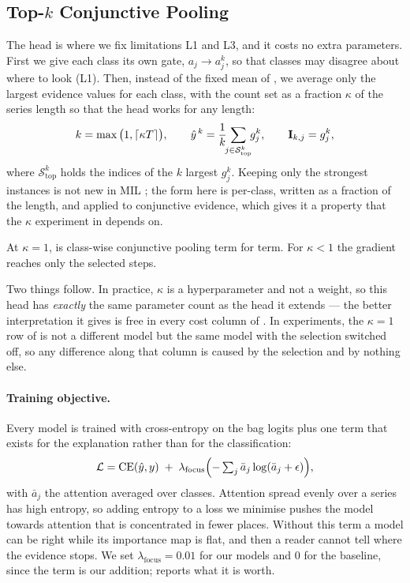 \subsection{Top-$k$ Conjunctive Pooling}
\label{sec:method:head}

The head is where we fix limitations L1 and L3, and it costs no extra parameters. First we give each
class its own gate, $a_j \rightarrow a_j^k$, so that classes may disagree about where to look (L1).
Then, instead of the fixed mean of , we average only the largest evidence values
for each class, with the count set as a fraction $\kappa$ of the series length so that the head works
for any length:
\begin{equation}
  k = \max\big(1, \lceil \kappa T \rceil\big),
  \qquad
  \hat{y}^{\,k} = \frac{1}{k}\!\!\sum_{j \in \mathcal{S}^k_{\mathrm{top}}}\!\! g_j^k,
  \qquad
  \mathbf{I}_{k,j} = g_j^k ,
  \label{eq:topk}
\end{equation}
where $\mathcal{S}^k_{\mathrm{top}}$ holds the indices of the $k$ largest $g_j^k$. Keeping only the
strongest instances is not new in MIL \citep{durand2016weldon}; the form here is per-class, written as
a fraction of the length, and applied to conjunctive evidence, which gives it a property that the
$\kappa$ experiment in  depends on.

\begin{property}
\label{prop:topk}
At $\kappa = 1$,  is class-wise conjunctive pooling term for term. For $\kappa < 1$ the
gradient reaches only the selected steps.
\end{property}

Two things follow. In practice, $\kappa$ is a hyperparameter and not a weight, so this head has
\emph{exactly} the same parameter count as the head it extends --- the better interpretation it gives
is free in every cost column of . In experiments, the $\kappa = 1$ row of
 is not a different model but the same model with the selection switched off, so
any difference along that column is caused by the selection and by nothing else.

\paragraph{Training objective.}
Every model is trained with cross-entropy on the bag logits plus one term that exists for the
explanation rather than for the classification:
\begin{equation}
  \mathcal{L} = \mathrm{CE}(\hat{y}, y)
  \;+\; \lambda_{\mathrm{focus}} \Big({-}\textstyle\sum_{j} \bar a_j \log(\bar a_j + \epsilon)\Big),
  \label{eq:loss}
\end{equation}
with $\bar a_j$ the attention averaged over classes. Attention spread evenly over a series has high
entropy, so adding entropy to a loss we minimise pushes the model towards attention that is
concentrated in fewer places. Without this term a model can be right while its importance map is
flat, and then a reader cannot tell where the evidence stops. We set $\lambda_{\mathrm{focus}} = 0.01$ for our models and $0$ for the \millet{} baseline,
since the term is our addition;  reports what it is worth.
